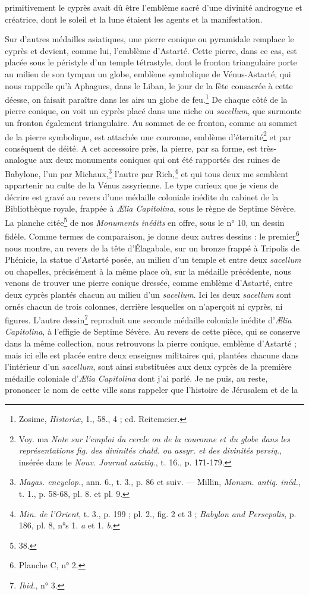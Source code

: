 \documentclass[a4paper, 11pt, oneside, polutonikogreek, french]{article}
\begin{document}
primitivement le cyprès avait dû être l'emblème sacré d'une divinité androgyne et créatrice, dont le soleil et la lune étaient les agents et la manifestation.

Sur d'autres médailles asiatiques, une pierre conique ou pyramidale remplace le cyprès et devient, comme lui, l'emblème d'Astarté. Cette pierre, dans ce cas, est placée sous le péristyle d'un temple tétrastyle, dont le fronton triangulaire porte au milieu de son tympan un globe, emblème symbolique de Vénus-Astarté, qui nous rappelle qu'à Aphagues, dans le Liban, le jour de la fête consacrée à cette déesse, on faisait paraître dans les airs un globe de feu.\footnote{Zosime, \emph{Historiæ}, 1., 58., 4 ; ed. Reitemeier.} De chaque côté de la pierre conique, on voit un cyprès placé dans une niche ou \emph{sacellum}, que surmonte un fronton également triangulaire. Au sommet de ce fronton, comme au sommet de la pierre symbolique, est attachée une couronne, emblème d'éternité\footnote{Voy. ma \emph{Note sur l'emploi du cercle ou de la couronne et du globe dans les représentations fig. des divinités chald. ou assyr. et des divinités persiq.}, insérée dans le \emph{Nouv. Journal asiatiq.}, t. 16., p. 171-179.} et par conséquent de déité. A cet accessoire près, la pierre, par sa forme, est très-analogue aux deux monuments coniques qui ont été rapportés des ruines de Babylone, l'un par Michaux,\footnote{\emph{Magas. encyclop.}, ann. 6., t. 3., p. 86 et suiv. --- Millin, \emph{Monum. antiq. inéd.}, t. 1., p. 58-68, pl. 8. et pl. 9.} l'autre par Rich,\footnote{\emph{Min. de l'Orient}, t. 3., p. 199 ; pl. 2., fig. 2 et 3 ; \emph{Babylon and Persepolis}, p. 186, pl. 8, n°s 1. \emph{a} et 1. \emph{b}.} et qui tous deux me semblent appartenir au culte de la Vénus assyrienne. Le type curieux que je viens de décrire est gravé au revers d'une médaille coloniale inédite du cabinet de la Bibliothèque royale, frappée à \emph{Ælia Capitolina}, sous le règne de Septime Sévère. La planche citée\footnote{38.} de nos \emph{Monuments inédits} en offre, sous le n° 10, un dessin fidèle. Comme termes de comparaison, je donne deux autres dessins : le premier\footnote{Planche C, n° 2.} nous montre, au revers de la tête d'Élagabale, sur un bronze frappé à Tripolis de Phénicie, la statue d'Astarté posée, au milieu d'un temple et entre deux \emph{sacellum} ou chapelles, précisément à la même place où, sur la médaille précédente, nous venons de trouver une pierre conique dressée, comme emblème d'Astarté, entre deux cyprès plantés chacun au milieu d'un \emph{sacellum}. Ici les deux \emph{sacellum} sont ornés chacun de trois colonnes, derrière lesquelles on n'aperçoit ni cyprès, ni figures. L'autre dessin\footnote{\emph{Ibid.}, n° 3.} reproduit une seconde médaille coloniale inédite d'\emph{Ælia Capitolina}, à l'effigie de Septime Sévère. Au revers de cette pièce, qui se conserve dans la même collection, nous retrouvons la pierre conique, emblème d'Astarté ; mais ici elle est placée entre deux enseignes militaires qui, plantées chacune dans l'intérieur d'un \emph{sacellum}, sont ainsi substituées aux deux cyprès de la première médaille coloniale d'\emph{Ælia Capitolina} dont j'ai parlé. Je ne puis, au reste, prononcer le nom de cette ville sans rappeler que l'histoire de Jérusalem et de la 
\end{document}
